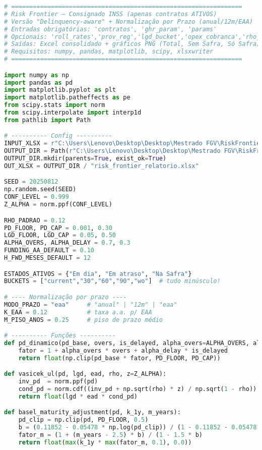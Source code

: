 \documentclass[11pt,a4paper]{article}
\newcommand{\1}{\mathbf{1}}
\begin{document}
\begin{lstlisting}[language=Python, caption={risk_frontier.py}]
# ================================================================
# Risk Frontier – Consignado INSS (apenas contratos ATIVOS)
# Versão "Delinquency-aware" + Normalização por Prazo (anual/12m/EAA)
# Entradas obrigatórias: 'contratos', 'ghr_param', 'params'
# Opcionais: 'roll_rates','prov_reg','lgd_bucket','opex_cobranca','rho_mult_bucket'
# Saídas: Excel consolidado + gráficos PNG (Total, Sem Safra, Só Safra)
# Requisitos: numpy, pandas, matplotlib, scipy, xlsxwriter
# ================================================================

import numpy as np
import pandas as pd
import matplotlib.pyplot as plt
import matplotlib.patheffects as pe
from scipy.stats import norm
from scipy.interpolate import interp1d
from pathlib import Path

# ---------- Config ----------
INPUT_XLSX = r"C:\Users\Lenovo\Desktop\Desktop\Mestrado FGV\RiskFrontier\exemplo_input_risk_frontier.xlsx"
OUTPUT_DIR = Path(r"C:\Users\Lenovo\Desktop\Desktop\Mestrado FGV\RiskFrontier")
OUTPUT_DIR.mkdir(parents=True, exist_ok=True)
OUT_XLSX = OUTPUT_DIR / "risk_frontier_relatorio.xlsx"

SEED = 20250812
np.random.seed(SEED)
CONF_LEVEL = 0.999
Z_ALPHA = norm.ppf(CONF_LEVEL)

RHO_PADRAO = 0.12
PD_FLOOR, PD_CAP = 0.001, 0.30
LGD_FLOOR, LGD_CAP = 0.05, 0.50
ALPHA_OVERS, ALPHA_DELAY = 0.7, 0.3
FUNDING_AA_DEFAULT = 0.10
H_FWD_MESES_DEFAULT = 12

ESTADOS_ATIVOS = {"Em dia", "Em atraso", "Na Safra"}
BUCKETS = ["current","30","60","90","wo"]  # tudo minúsculo!

# ---- Normalização por prazo ----
MODO_PRAZO = "eaa"     # "anual" | "12m" | "eaa"
K_EAA = 0.12           # taxa a.a. p/ EAA
M_PISO_ANOS = 0.25     # piso de prazo médio

# ---------- Funções ----------
def pd_dinamico(pd_base, overs, is_delayed, alpha_overs=ALPHA_OVERS, alpha_delay=ALPHA_DELAY):
    fator = 1 + alpha_overs * overs + alpha_delay * is_delayed
    return float(np.clip(pd_base * fator, PD_FLOOR, PD_CAP))

def vasicek_ul(pd, lgd, ead, rho, z=Z_ALPHA):
    inv_pd  = norm.ppf(pd)
    cond_pd = norm.cdf((inv_pd + np.sqrt(rho) * z) / np.sqrt(1 - rho))
    return float(lgd * ead * cond_pd)

def basel_maturity_adjustment(pd, k_1y, m_years):
    pd_clip = np.clip(pd, PD_FLOOR, 0.5)
    b = (0.11852 - 0.05478 * np.log(pd_clip)) / (1 - 0.11852 - 0.05478 * np.log(pd_clip))
    fator_m = (1 + (m_years - 2.5) * b) / (1 - 1.5 * b)
    return float(max(k_1y * max(fator_m, 0.1), 0.0))


\end{lstlisting}
\end{document}
